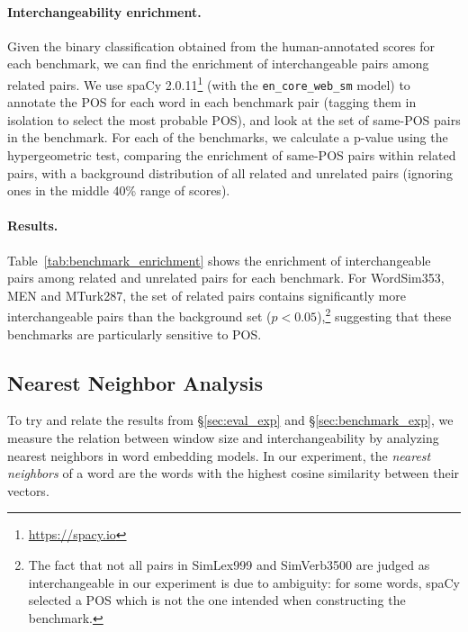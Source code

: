 \documentclass[11pt,a4paper]{article}
\begin{document}
    \paragraph{Interchangeability enrichment.}
    
    Given the binary classification obtained from the human-annotated scores
    for each benchmark, we can find the enrichment of interchangeable pairs among
    related pairs.
    We use spaCy 2.0.11\footnote{\url{https://spacy.io}} (with the \texttt{en\_core\_web\_sm} model)
    to annotate the POS for each word in each benchmark
    pair (tagging them in isolation to select the most probable POS),
    and look at the set of same-POS pairs in the benchmark.
    For each of the benchmarks, we calculate a p-value using the hypergeometric
    test, comparing the enrichment of same-POS pairs within related pairs,
    with a background distribution of all related and unrelated pairs (ignoring ones in
    the middle 40\% range of scores).
    
    \paragraph{Results.}
    
    Table~\ref{tab:benchmark_enrichment} shows the enrichment of interchangeable pairs
    among related and unrelated pairs for each benchmark.
    For WordSim353, MEN and MTurk287, the set of related pairs
    contains significantly more interchangeable pairs than the background
    set ($p<0.05$),\footnote{The fact that not all pairs in SimLex999 and SimVerb3500
    are judged as interchangeable
    in our experiment is due to ambiguity: for some words, spaCy selected a POS
    which is not the one intended when constructing the benchmark.}
    suggesting that these benchmarks are particularly sensitive to POS.
    
    
    \subsection{Nearest Neighbor Analysis}\label{sec:interchangeability_exp}
    
    To try and relate the results from \S\ref{sec:eval_exp} and \S\ref{sec:benchmark_exp},
    we measure the relation between window size and interchangeability
    by analyzing nearest neighbors in word embedding models.
    In our experiment, the \textit{nearest neighbors} of a word are the words
    with the highest cosine similarity between their vectors.
        
\end{document}
